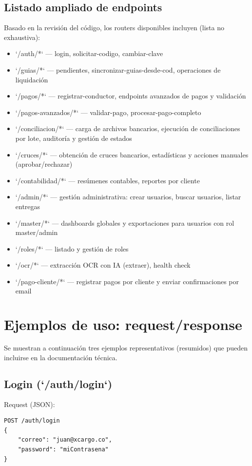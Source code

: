 \subsection{Listado ampliado de endpoints}
Basado en la revisión del código, los routers disponibles incluyen (lista no exhaustiva):
\begin{itemize}
\item `/auth/*` — login, solicitar-codigo, cambiar-clave
\item `/guias/*` — pendientes, sincronizar-guias-desde-cod, operaciones de liquidación
\item `/pagos/*` — registrar-conductor, endpoints avanzados de pagos y validación
\item `/pagos-avanzados/*` — validar-pago, procesar-pago-completo
\item `/conciliacion/*` — carga de archivos bancarios, ejecución de conciliaciones por lote, auditoría y gestión de estados
\item `/cruces/*` — obtención de cruces bancarios, estadísticas y acciones manuales (aprobar/rechazar)
\item `/contabilidad/*` — resúmenes contables, reportes por cliente
\item `/admin/*` — gestión administrativa: crear usuarios, buscar usuarios, listar entregas
\item `/master/*` — dashboards globales y exportaciones para usuarios con rol master/admin
\item `/roles/*` — listado y gestión de roles
\item `/ocr/*` — extracción OCR con IA (extraer), health check
\item `/pago-cliente/*` — registrar pagos por cliente y enviar confirmaciones por email
\end{itemize}

\section{Ejemplos de uso: request/response}
Se muestran a continuación tres ejemplos representativos (resumidos) que pueden incluirse en la documentación técnica.

\subsection{Login (`/auth/login`)}
Request (JSON):
\begin{verbatim}
POST /auth/login
{
    "correo": "juan@xcargo.co",
    "password": "miContrasena"
}
\end{verbatim}

